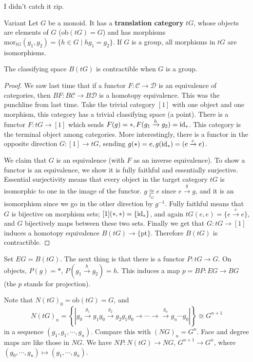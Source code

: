 \begin{remark}
  I didn't catch it rip.  
\end{remark}
\begin{namedthing}{Variant} 
    Let $G$ be a monoid. It has a \textbf{translation category} $tG$, whose objects are elements of $G$ ($\mathrm{ob}(tG)=G$)  and has morphisms $\mathrm{mor}_{tG}(g_1,g_2)=\{h \in G \mid hg_1=g_2\} $. If $G$ is a group, all morphisms in $tG$ are isomorphisms.
\end{namedthing}
\begin{prop}
    The classifying space $B(tG)$ is contractible when $G$ is a group.
\end{prop}
\begin{proof}
    We saw last time that if a functor $F \colon \mathcal{C}  \to \mathcal{D} $ is an equivalence of categories, then $BF \colon B\mathcal{C}  \to B\mathcal{D} $ is a homotopy equivalence. This was the punchline from last time. Take the trivial category $[1]$ with one object and one morphism, this category has a trivial classifying space (a point). There is a functor $F \colon tG \to [1]$ which sends $F(g)=*,F(g_1\xrightarrow h g_2)=\operatorname{id}_*$. This category is the terminal object among categories. More interestingly, there is a functor in the opposite direction $G \colon [1] \to tG$, sending $g(*)=e,g(\operatorname{id}_*)=(e \xrightarrow ee)$. 

    We claim that $G$ is an equivalence (with $F$ as an inverse equivalence). To show a functor is an equivalence, we show it is fully faithful and essentially surjective. Essential surjectivity means that every object in the target category $tG$ is isomorphic to one in the image of the functor. $g \underset{t_G}{\cong} e$ since $e \xrightarrow gg$, and it is an isomorphism since we go in the other direction by $g^{-1}$. Fully faithful means that $G$ is bijective on morphism sets; $[1](*,*)=\{\operatorname{id}_*\} $, and again $tG(e,e)=\{e \xrightarrow ee\} $, and $G$ bijectively maps between these two sets. Finally we get that $G \colon tG \to [1]$ induces a homotopy equivalence $B(tG) \to  \{\text{pt} \} $. Therefore $B(tG)$ is contractible.
\end{proof}
Set $EG=B(tG)$. The next thing is that there is a functor $P \colon tG \to G$. On objects, $P(g)=*$, $P(g_1 \xrightarrow hg_2)=h$. This induces a map $p=BP\colon EG \to BG$ (the $p$ stands for projection).
\begin{note}
    Note that $N(tG)_0=\mathrm{ob}(tG)=G$, and 
    \[
    N(tG)_n = \left\{ \left| g_0 \xrightarrow{g_1} g_1g_0 \xrightarrow{g_2} g_2g_1g_0 \to  \cdots  \to  \xrightarrow{g_n } g_n  \cdots g_0 \right|  \right\} \cong G^{n+1}
\] in a sequence $(g_1,g_1,\cdots ,g_n )$. Compare this with $(NG)_n =G^n $. Face and degree maps are like those in $NG$. We have $NP \colon N(tG) \to NG$, $G^{n+1}\to  G^n $, where $(g_0 ,\cdots ,g_n ) \mapsto (g_1, \cdots ,g_n )$. 
\end{note}
